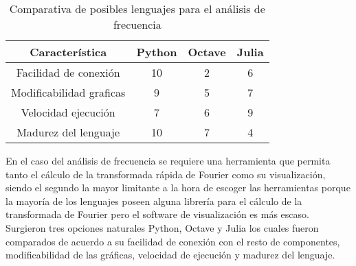     \begin{table}[ht]
        \caption[Comparativa de posibles lenguajes para el análisis de frecuencia]{Comparativa de posibles lenguajes para el análisis de frecuencia}
        \label{tab:LenguajesAnalisisFrecuencia}
        \begin{center}
            \vspace{0.3cm}
            \begin{tabular}{|c|c|c|c|}
                \hline
                Característica              & Python & Octave & Julia\\\hline
                \hline
                Facilidad de conexión       & 10    & 2     & 6 \\\hline
                Modificabilidad graficas    & 9     & 5     & 7 \\\hline
                Velocidad ejecución         & 7     & 6     & 9 \\\hline
                Madurez del lenguaje        & 10    & 7     & 4 \\\hline
            \end{tabular}
        \end{center}
    \end{table}

    En el caso del análisis de frecuencia se requiere una herramienta que
    permita tanto el cálculo de la transformada rápida de Fourier como su
    visualización, siendo el segundo la mayor limitante a la hora de escoger
    las herramientas porque la mayoría de los lenguajes poseen alguna librería
    para el cálculo de la transformada de Fourier pero el software de
    visualización es más escaso. Surgieron tres opciones naturales Python,
    Octave y Julia los cuales fueron comparados de acuerdo a su facilidad de
    conexión con el resto de componentes, modificabilidad de las gráficas,
    velocidad de ejecución y madurez del lenguaje.
